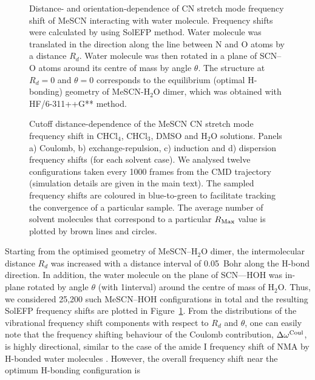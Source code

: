\documentclass[b5paper,oneside,fleqn,11pt]{book}
\begin{document}
\begin{refsection}
\begin{figure}[t!]
\centering
\setlength\fboxsep{0.4pt}
\setlength\fboxrule{0.5pt}
\caption{
Distance- and orientation\hyp{}dependence of CN stretch mode frequency shift of MeSCN interacting with water
molecule. Frequency shifts were calculated by using SolEFP method. Water molecule was translated in the
direction along the line between N and O atoms by a distance $R_d$. Water molecule was then rotated in a
plane of SCN--O atoms around its centre of mass by angle $\theta$. The structure at $R_d=0$ and $\theta=0$ corresponds to
the equilibrium (optimal H-bonding) geometry of MeSCN-H$_2$O dimer, which was obtained with
HF/6-311++G** method.
\label{f:mescn-scan}}
\end{figure}
%
\begin{figure}[t!]
\centering
\setlength\fboxsep{0.4pt}
\setlength\fboxrule{0.5pt}
\caption{
Cutoff distance\hyp{}dependence of the MeSCN CN stretch mode frequency shift in
CHCl$_4$, CHCl$_3$, DMSO and H$_2$O solutions. Panels a) Coulomb, b) exchange\hyp{}repulsion, c)
induction and d) dispersion frequency shifts (for each solvent case). 
We analysed twelve configurations taken every 1000
frames from the CMD trajectory (simulation details are given in the main text). The sampled
frequency shifts are coloured in blue\hyp{}to\hyp{}green to facilitate tracking the convergence of a
particular sample. The average number of solvent molecules that correspond to a particular
$R_{\rm Max}$ value is plotted by brown lines and circles.
\label{f:mescn-solefp-md-dist}}
\end{figure}
Starting from the optimised geometry of MeSCN--H$_2$O
dimer, the intermolecular distance $R_d$ was increased with
a distance interval of 0.05~Bohr along the H-bond direction. In
addition, the water molecule on the plane of SCN---HOH was
in\hyp{}plane rotated by angle $\theta$ (with 1\textdegree interval) around the centre
of mass of H$_2$O. Thus, we considered 25,200 such
MeSCN--HOH configurations in total and the resulting SolEFP
frequency shifts are plotted in Figure~\ref{f:mescn-scan}. From the distributions
of the vibrational frequency shift components with respect to
$R_d$ and $\theta$, one can easily note that the frequency shifting
behaviour of the Coulomb contribution, $\Delta\omega^{\rm Coul}$, is highly
directional, similar to the case of the amide I frequency shift of
NMA by H-bonded water molecules \citep{Blasiak.Cho.JCP.2015}. 
However, the overall
frequency shift near the optimum H-bonding configuration is

\end{refsection}
\end{document}
